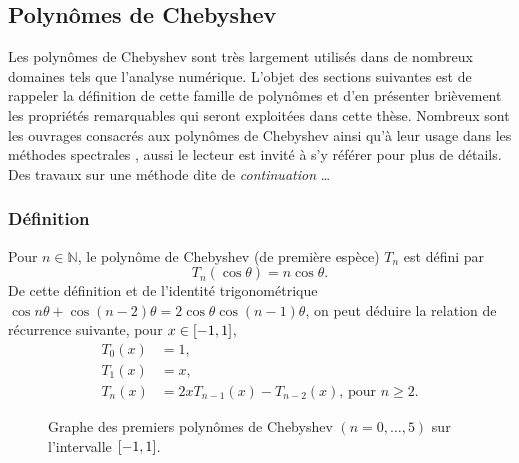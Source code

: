 \subsection{Polynômes de Chebyshev}
Les polynômes de Chebyshev sont très largement utilisés dans de nombreux domaines tels que l'analyse numérique.
L'objet des sections suivantes est de rappeler la définition de cette famille 
de polynômes et d'en présenter brièvement les propriétés remarquables qui seront exploitées dans cette thèse. 
Nombreux sont les ouvrages consacrés aux polynômes de Chebyshev \cite{mason2002, gil2007} ainsi qu'à leur usage dans les méthodes spectrales \cite{boyd2001, canuto2006}, aussi le lecteur est invité à s'y référer pour plus de détails.
Des travaux sur une méthode dite de \emph{continuation} \ldots

\subsubsection{Définition}
Pour $n \in \mathbb{N}$, le polynôme de Chebyshev (de première espèce) $T_n$ est défini par%
\begin{equation}
	T_n(\cos \theta) = n \cos \theta.
	\label{eq:chebyshev_trigo}
\end{equation}
De cette définition et de l'identité trigonométrique $\cos n\theta + \cos (n-2)\theta = 2\cos \theta \cos (n-1)\theta$, on peut déduire la relation de récurrence suivante, pour $x \in \left[ -1, 1 \right]$, 
\begin{align}
	T_0(x) &= 1, \nonumber\\
	T_1(x) &= x, \nonumber\\
	T_n(x) &= 2x T_{n-1}(x) - T_{n-2}(x) \text{,\ pour\ } n \geq 2.
	\label{eq:chebyshev_recurrence}
\end{align}


\begin{figure}
	\centering
	
	\caption{Graphe des premiers polynômes de Chebyshev $(n=0,\ldots,5)$ sur l'intervalle $\left[ -1, 1 \right]$.}
	\label{fig:chebyshev_polynomials}
\end{figure}


